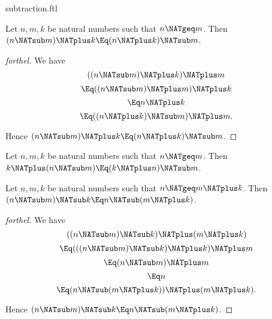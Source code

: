 \documentclass{stex}
\begin{document}
\begin{smodule}{subtraction.ftl}
\begin{proposition}[forthel]
  Let $n, m, k$ be natural numbers such that $n \NATgeq m$.
  Then $(n \NATsub m) \NATplus k \Eq (n \NATplus k) \NATsub m$.
\end{proposition}
\begin{proof}[forthel]
  We have
  \[  ((n \NATsub m) \NATplus k) \NATplus m       \]
  \[    \Eq ((n \NATsub m) \NATplus m) \NATplus k   \]
  \[    \Eq n \NATplus k               \]
  \[    \Eq ((n \NATplus k) \NATsub m) \NATplus m.  \]

  Hence $(n \NATsub m) \NATplus k \Eq (n \NATplus k) \NATsub m$.
\end{proof}


\begin{corollary}[forthel,name=associativity of addition and subtraction]
  Let $n, m, k$ be natural numbers such that $n \NATgeq m$.
  Then $k \NATplus (n \NATsub m) \Eq (k \NATplus n) \NATsub m$.
\end{corollary}

\begin{proposition}[forthel]
  Let $n, m, k$ be natural numbers such that $n \NATgeq  m \NATplus k$.
  Then $(n \NATsub m) \NATsub k \Eq n \NATsub (m \NATplus k)$.
\end{proposition}
\begin{proof}[forthel]
  We have
  \[  ((n \NATsub m) \NATsub k) \NATplus (m \NATplus k)       \]
  \[    \Eq (((n \NATsub m) \NATsub k) \NATplus k) \NATplus m   \]
  \[    \Eq (n \NATsub m) \NATplus m               \]
  \[    \Eq n                         \]
  \[    \Eq (n \NATsub (m \NATplus k)) \NATplus (m \NATplus k).  \]

  Hence $(n \NATsub m) \NATsub k \Eq n \NATsub (m \NATplus k)$.
\end{proof}
\end{smodule}
\end{document}
